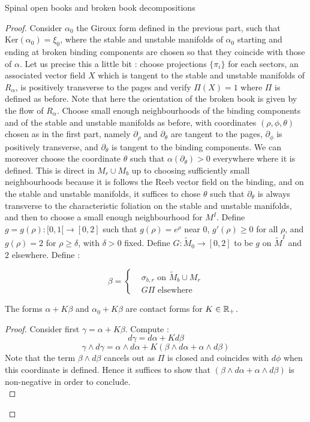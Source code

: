 \documentclass[../main.tex]{subfiles}
\begin{document}
\begin{section}{Spinal open books and broken book decompositions}
\begin{proof}
Consider $\alpha_0$ the Giroux form defined in the previous part, such that $\text{Ker}(\alpha_0) = \xi_0$, where the stable and unstable manifolds of $\alpha_0$ starting and ending at broken binding components are chosen so that they coincide with those of $\alpha$. Let us precise this a little bit : choose projections $\{\pi_i\}$ for each sectors, an associated vector field $X$ which is tangent to the stable and unstable manifolds of $R_\alpha$, is positively transverse to the pages and verify $\Pi(X) = 1$ where $\Pi$ is defined as before. Note that here the orientation of the broken book is given by the flow of $R_\alpha$. Choose small enough neighbourhoods of the binding components and of the stable and unstable manifolds as before, with coordinates $(\rho,\phi,\theta)$ chosen as in the first part, namely $\partial_\rho$ and $\partial_\theta$ are tangent to the pages, $\partial_\phi$ is positively transverse, and $\partial_\theta$ is tangent to the binding components. We can moreover choose the coordinate $\theta$ such that $\alpha(\partial_\theta)>0$ everywhere where it is defined. This is direct in $M_r\cup M_b$ up to choosing sufficiently small neighbourhoods because it is follows the Reeb vector field on the binding, and on the stable and unstable manifolds, it suffices to chose $\theta$ such that $\partial_\theta$ is always transverse to the characteristic foliation on the stable and unstable manifolds, and then to choose a small enough neighbourhood for $M^I$.  Define $g = g(\rho): [0,1[\rightarrow [0,2]$ such that $g(\rho) = e^\rho$ near $0$, $g'(\rho)\geq 0$ for all $\rho$, and $g(\rho) = 2$ for $\rho\geq \delta$, with $\delta> 0$ fixed. Define $G : \tilde M_0 \rightarrow [0,2] $ to be $g$ on $\tilde M^I$ and $2$ elsewhere. Define :

$$\beta = \left\{\begin{array}{lll} 
&\sigma_{b,r} \mbox{ on } \tilde M_b\cup M_r\\
& G  \Pi \mbox{  elsewhere}
\end{array}\right.$$

\begin{lemma}
The forms $\alpha + K\beta$ and $\alpha_0 + K\beta$ are contact forms for $K\in \mathbb{R}_+$.
\end{lemma}

\begin{proof}
Consider first $\gamma = \alpha + K\beta$. Compute : 
$$d\gamma = d\alpha + Kd\beta$$
$$\gamma\wedge d\gamma = \alpha\wedge d\alpha + K(\beta \wedge d\alpha + \alpha\wedge d\beta)$$
Note that the term $\beta\wedge d\beta$ cancels out as $\Pi$ is closed and coincides with $d\phi$ when this coordinate is defined. Hence it suffices to show that $(\beta \wedge d\alpha + \alpha\wedge d\beta)$ is non-negative in order to conclude.\\


\end{proof}
\end{proof}
\end{section}
\end{document}
